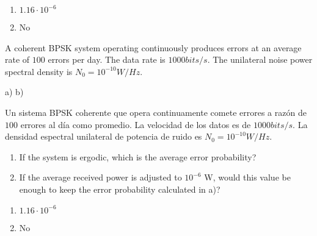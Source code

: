 \documentclass[idioma,boletin]{uah}
\begin{document}
{

\begin{enumerate}
	\item $1.16 \cdot 10^{-6}$
	\item No
\end{enumerate}
}
{


A coherent BPSK system operating continuously produces errors at an average rate of $100$ errors per day. The data rate is $1000 bits/s$. The unilateral noise power spectral density is $N_0 = 10^{-10} W/Hz$. 

a)	
b)	

Un sistema BPSK coherente que opera continuamente comete errores a razón de $100$ errores al día como promedio. La velocidad de los datos es de $1000 bits/s$. La densidad espectral unilateral de potencia de ruido es $N_0 = 10^{-10} W/Hz$.

\begin{enumerate}
	\item If the system is ergodic, which is the average error probability?
	\item If the average received power is adjusted to $10^{-6}$ W, would this value be enough to keep the error probability calculated in a)?
\end{enumerate} 

}
{

\begin{enumerate}
	\item $1.16 \cdot 10^{-6}$
	\item No
\end{enumerate}
}

\newpage
\end{document}
